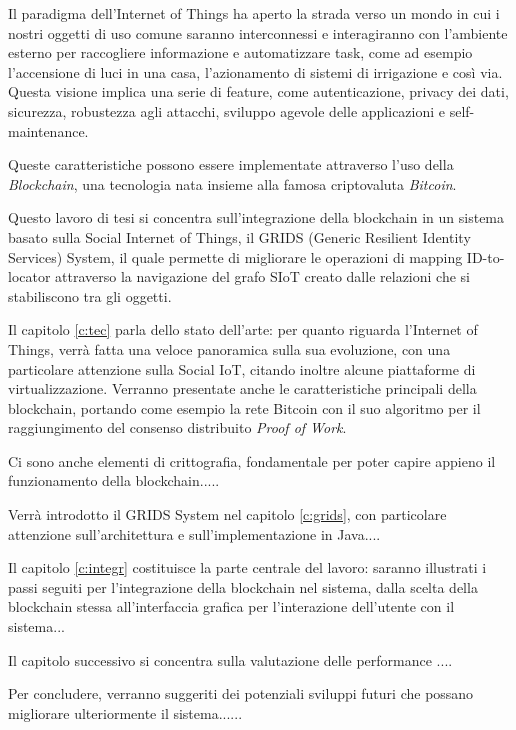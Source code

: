 Il paradigma dell'Internet of Things ha aperto la strada verso un mondo in cui i nostri oggetti di uso comune saranno interconnessi e interagiranno con l'ambiente esterno per raccogliere informazione e automatizzare task, come ad esempio l'accensione di luci in una casa, l'azionamento di sistemi di irrigazione e così via. Questa visione implica una serie di feature, come autenticazione, privacy dei dati, sicurezza, robustezza agli attacchi, sviluppo agevole delle applicazioni e self-maintenance.\cite{Fernandez-Carames2018}

Queste caratteristiche possono essere implementate attraverso l'uso della \textit{Blockchain}, una tecnologia nata insieme alla famosa criptovaluta \textit{Bitcoin}. 

Questo lavoro di tesi si concentra sull'integrazione della blockchain in un sistema basato sulla Social Internet of Things, il GRIDS (Generic Resilient Identity Services) System, il quale permette di migliorare le operazioni di mapping ID-to-locator attraverso la navigazione del grafo SIoT creato dalle relazioni che si stabiliscono tra gli oggetti.

Il capitolo \ref{c:tec} parla dello stato dell'arte: per quanto riguarda l'Internet of Things, verrà fatta una veloce panoramica sulla sua evoluzione, con una particolare attenzione sulla Social IoT, citando inoltre alcune piattaforme di virtualizzazione. Verranno presentate anche le caratteristiche principali della blockchain, portando come esempio la rete Bitcoin con il suo algoritmo per il raggiungimento del consenso distribuito \textit{Proof of Work}. 

Ci sono anche elementi di crittografia, fondamentale per poter capire appieno il funzionamento della blockchain.....

Verrà introdotto il GRIDS System nel capitolo \ref{c:grids}, con particolare attenzione sull'architettura e sull'implementazione in Java....

Il capitolo \ref{c:integr} costituisce la parte centrale del lavoro: saranno illustrati i passi seguiti per l'integrazione della blockchain nel sistema, dalla scelta della blockchain stessa all'interfaccia grafica per l'interazione dell'utente con il sistema...

Il capitolo successivo si concentra sulla valutazione delle performance ....

Per concludere, verranno suggeriti dei potenziali sviluppi futuri che possano migliorare ulteriormente il sistema......